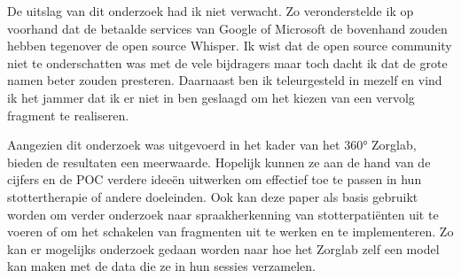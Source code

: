 De uitslag van dit onderzoek had ik niet verwacht. Zo veronderstelde ik op voorhand dat de betaalde services van Google of Microsoft de bovenhand zouden hebben tegenover de open source Whisper. Ik wist dat de open source community niet te onderschatten was met de vele bijdragers maar toch dacht ik dat de grote namen beter zouden presteren. Daarnaast ben ik teleurgesteld in mezelf en vind ik het jammer dat ik er niet in ben geslaagd om het kiezen van een vervolg fragment te realiseren.

Aangezien dit onderzoek was uitgevoerd in het kader van het 360° Zorglab, bieden de resultaten een meerwaarde. Hopelijk kunnen ze aan de hand van de cijfers en de POC verdere ideeën uitwerken om effectief toe te passen in hun stottertherapie of andere doeleinden. Ook kan deze paper als basis gebruikt worden om verder onderzoek naar spraakherkenning van stotterpatiënten uit te voeren of om het schakelen van fragmenten uit te werken en te implementeren. Zo kan er mogelijks onderzoek gedaan worden naar hoe het Zorglab zelf een model kan maken met de data die ze in hun sessies verzamelen.

